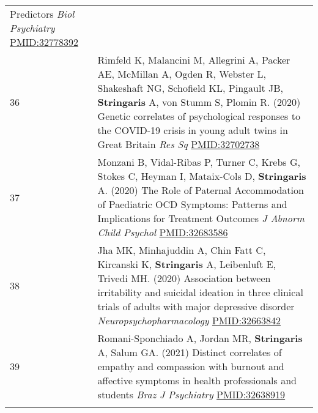 \documentclass[
]{article}
\begin{document}
\begin{longtable}[]{@{}ll@{}}
\begin{minipage}[t]{0.94\columnwidth}
Predictors \emph{Biol Psychiatry} \url{PMID:32778392}\strut
\end{minipage}\tabularnewline
\begin{minipage}[t]{0.01\columnwidth}\raggedright
36\strut
\end{minipage} & \begin{minipage}[t]{0.94\columnwidth}\raggedright
Rimfeld K, Malancini M, Allegrini A, Packer AE, McMillan A, Ogden R,
Webster L, Shakeshaft NG, Schofield KL, Pingault JB, \textbf{Stringaris}
A, von Stumm S, Plomin R. (2020) Genetic correlates of psychological
responses to the COVID-19 crisis in young adult twins in Great Britain
\emph{Res Sq} \url{PMID:32702738}\strut
\end{minipage}\tabularnewline
\begin{minipage}[t]{0.01\columnwidth}\raggedright
37\strut
\end{minipage} & \begin{minipage}[t]{0.94\columnwidth}\raggedright
Monzani B, Vidal-Ribas P, Turner C, Krebs G, Stokes C, Heyman I,
Mataix-Cols D, \textbf{Stringaris} A. (2020) The Role of Paternal
Accommodation of Paediatric OCD Symptoms: Patterns and Implications for
Treatment Outcomes \emph{J Abnorm Child Psychol}
\url{PMID:32683586}\strut
\end{minipage}\tabularnewline
\begin{minipage}[t]{0.01\columnwidth}\raggedright
38\strut
\end{minipage} & \begin{minipage}[t]{0.94\columnwidth}\raggedright
Jha MK, Minhajuddin A, Chin Fatt C, Kircanski K, \textbf{Stringaris} A,
Leibenluft E, Trivedi MH. (2020) Association between irritability and
suicidal ideation in three clinical trials of adults with major
depressive disorder \emph{Neuropsychopharmacology}
\url{PMID:32663842}\strut
\end{minipage}\tabularnewline
\begin{minipage}[t]{0.01\columnwidth}\raggedright
39\strut
\end{minipage} & \begin{minipage}[t]{0.94\columnwidth}\raggedright
Romani-Sponchiado A, Jordan MR, \textbf{Stringaris} A, Salum GA. (2021)
Distinct correlates of empathy and compassion with burnout and affective
symptoms in health professionals and students \emph{Braz J Psychiatry}
\url{PMID:32638919}\strut
\end{minipage}\tabularnewline
\begin{minipage}[t]{0.01\columnwidth}\raggedright

\end{minipage}
\end{longtable}
\end{document}
